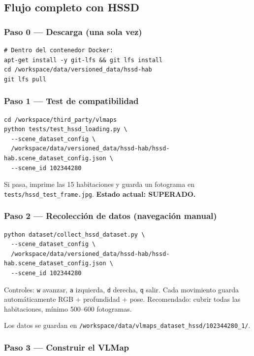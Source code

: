 \documentclass[11pt,a4paper]{article}
\begin{document}
\subsection{Flujo completo con HSSD}

\subsubsection*{Paso 0 --- Descarga (una sola vez)}

\begin{verbatim}
# Dentro del contenedor Docker:
apt-get install -y git-lfs && git lfs install
cd /workspace/data/versioned_data/hssd-hab
git lfs pull
\end{verbatim}

\subsubsection*{Paso 1 --- Test de compatibilidad}

\begin{verbatim}
cd /workspace/third_party/vlmaps
python tests/test_hssd_loading.py \
  --scene_dataset_config \
  /workspace/data/versioned_data/hssd-hab/hssd-hab.scene_dataset_config.json \
  --scene_id 102344280
\end{verbatim}

Si pasa, imprime las 15 habitaciones y guarda un fotograma en \texttt{tests/hssd\_test\_frame.jpg}. \textbf{Estado actual: SUPERADO.}

\subsubsection*{Paso 2 --- Recolección de datos (navegación manual)}

\begin{verbatim}
python dataset/collect_hssd_dataset.py \
  --scene_dataset_config \
  /workspace/data/versioned_data/hssd-hab/hssd-hab.scene_dataset_config.json \
  --scene_id 102344280
\end{verbatim}

Controles: \texttt{w} avanzar, \texttt{a} izquierda, \texttt{d} derecha, \texttt{q} salir. Cada movimiento guarda automáticamente RGB + profundidad + pose. Recomendado: cubrir todas las habitaciones, mínimo 500--600 fotogramas.

Los datos se guardan en \texttt{/workspace/data/vlmaps\_dataset\_hssd/102344280\_1/}.

\subsubsection*{Paso 3 --- Construir el VLMap}
\end{document}
